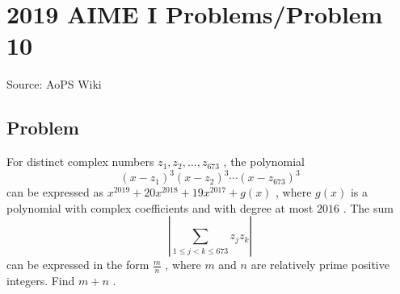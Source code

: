 \documentclass[12pt]{article}
\begin{document}
\section*{{2019 AIME I Problems/Problem 10}}
Source: AoPS Wiki

\subsection*{Problem}
For distinct complex numbers $z_1,z_2,\dots,z_{673}$ , the polynomial \[(x-z_1)^3(x-z_2)^3 \cdots (x-z_{673})^3\] can be expressed as $x^{2019} + 20x^{2018} + 19x^{2017}+g(x)$ , where $g(x)$ is a polynomial with complex coefficients and with degree at most $2016$ . The sum \[\left| \sum_{1 \le j <k \le 673} z_jz_k \right|\] can be expressed in the form $\frac{m}{n}$ , where $m$ and $n$ are relatively prime positive integers. Find $m+n$ .
\end{document}
